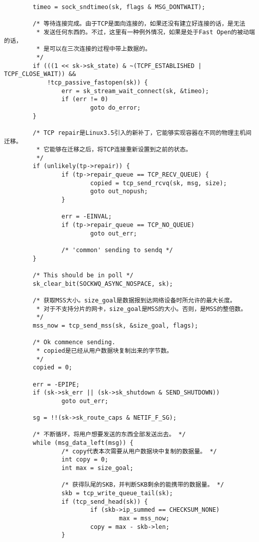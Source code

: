 \begin{verbatim}
        timeo = sock_sndtimeo(sk, flags & MSG_DONTWAIT);

        /* 等待连接完成。由于TCP是面向连接的，如果还没有建立好连接的话，是无法
         * 发送任何东西的。不过，这里有一种例外情况，如果是处于Fast Open的被动端的话，
         * 是可以在三次连接的过程中带上数据的。
         */
        if (((1 << sk->sk_state) & ~(TCPF_ESTABLISHED | TCPF_CLOSE_WAIT)) &&
            !tcp_passive_fastopen(sk)) {
                err = sk_stream_wait_connect(sk, &timeo);
                if (err != 0)
                        goto do_error;
        }

        /* TCP repair是Linux3.5引入的新补丁，它能够实现容器在不同的物理主机间迁移。
         * 它能够在迁移之后，将TCP连接重新设置到之前的状态。
         */
        if (unlikely(tp->repair)) {
                if (tp->repair_queue == TCP_RECV_QUEUE) {
                        copied = tcp_send_rcvq(sk, msg, size);
                        goto out_nopush;
                }

                err = -EINVAL;
                if (tp->repair_queue == TCP_NO_QUEUE)
                        goto out_err;

                /* 'common' sending to sendq */
        }

        /* This should be in poll */
        sk_clear_bit(SOCKWQ_ASYNC_NOSPACE, sk);

        /* 获取MSS大小。size_goal是数据报到达网络设备时所允许的最大长度。
         * 对于不支持分片的网卡，size_goal是MSS的大小。否则，是MSS的整倍数。
         */
        mss_now = tcp_send_mss(sk, &size_goal, flags);

        /* Ok commence sending. 
         * copied是已经从用户数据块复制出来的字节数。
         */
        copied = 0;

        err = -EPIPE;
        if (sk->sk_err || (sk->sk_shutdown & SEND_SHUTDOWN))
                goto out_err;

        sg = !!(sk->sk_route_caps & NETIF_F_SG);

        /* 不断循环，将用户想要发送的东西全部发送出去。 */
        while (msg_data_left(msg)) {
                /* copy代表本次需要从用户数据块中复制的数据量。 */
                int copy = 0;
                int max = size_goal;

                /* 获得队尾的SKB，并判断SKB剩余的能携带的数据量。 */
                skb = tcp_write_queue_tail(sk);
                if (tcp_send_head(sk)) {
                        if (skb->ip_summed == CHECKSUM_NONE)
                                max = mss_now;
                        copy = max - skb->len;
                }


\end{verbatim}
